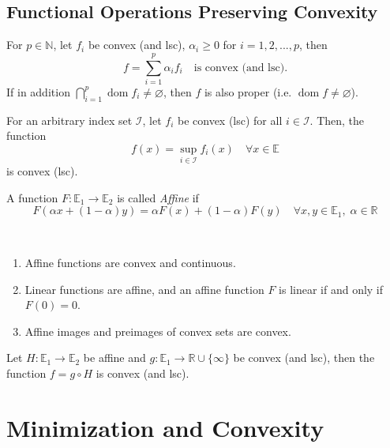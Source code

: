 \documentclass{tufte-handout}
\DeclareMathOperator{\dom}{dom}
\begin{document}
{\subsection{Functional Operations Preserving Convexity}%
  \label{sub:Functional Operations Preserving Convexity}
  \begin{proposition} \label{label}
    For $p\in \mathbb{N}$, let $f_i$ be convex (and lsc), $\alpha_i \geq 0$ for $i = 1,2,..., p$, then $$f = \sum^{p}_{i=1} \alpha_i f_i \quad \text{is convex (and lsc).} $$ 
    If in addition $\bigcap_{i = 1}^{p} \dom f_i \neq \varnothing$, then $f$ is also proper (i.e. $\dom f\neq \varnothing$). 
  \end{proposition}
  \begin{proposition}
    For an arbitrary index set $\mathcal{I}$, let $f_i$ be convex (lsc) for all $i \in \mathcal{I}$. Then, the function $$f(x) = \sup_{i \in \mathcal{I}} f_i(x) \quad \forall x \in \mathbb{E} $$
    is convex (lsc).
  \end{proposition}
  \begin{definition}
    A function $F: \mathbb{E}_1 \to \mathbb{E}_2$ is called \textit{Affine} if 
    $$F(\alpha x + (1- \alpha ) y) = \alpha F(x) + (1- \alpha) F(y) \quad \forall x , y \in \mathbb{E}_1, \; \alpha \in \mathbb{R} $$
  \end{definition}
  \begin{remark} 
    $  $
    \begin{enumerate}
      \item Affine functions are convex and continuous.
      \item Linear functions are affine, and an affine function $F$ is linear if and only if $F(0) = 0$. 
      \item Affine images and preimages of convex sets are convex. 
    \end{enumerate}
  \end{remark}
  \begin{proposition}
    Let $H: \mathbb{E}_1 \to \mathbb{E}_2$ be affine and $g: \mathbb{E}_1 \to \mathbb{R}\cup \{\infty\}$ be convex (and lsc), then the function $f = g \circ H$ is convex (and lsc). 
    
  \end{proposition}
\section{Minimization and Convexity}
  \label{sec:Minimization and Convexity}
}
\end{document}
